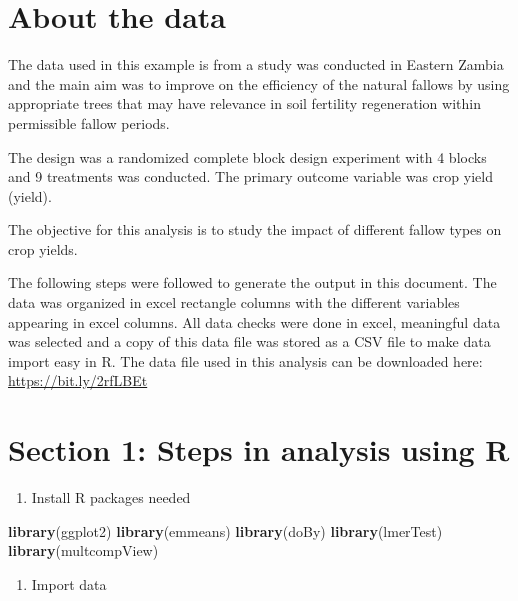 \documentclass[]{book}
\newenvironment{Shaded}{\begin{snugshade}}{\end{snugshade}}
\newcommand{\KeywordTok}[1]{\textcolor[rgb]{0.13,0.29,0.53}{\textbf{#1}}}
\newcommand{\NormalTok}[1]{#1}
\providecommand{\tightlist}{%
  \setlength{\itemsep}{0pt}\setlength{\parskip}{0pt}}
\theoremstyle{definition}
\theoremstyle{definition}
\theoremstyle{definition}
\theoremstyle{remark}
\begin{document}
\section{About the data}\label{about-the-data}

The data used in this example is from a study was conducted in Eastern
Zambia and the main aim was to improve on the efficiency of the natural
fallows by using appropriate trees that may have relevance in soil
fertility regeneration within permissible fallow periods.

The design was a randomized complete block design experiment with 4
blocks and 9 treatments was conducted. The primary outcome variable was
crop yield (yield).

The objective for this analysis is to study the impact of different
fallow types on crop yields.

The following steps were followed to generate the output in this
document. The data was organized in excel rectangle columns with the
different variables appearing in excel columns. All data checks were
done in excel, meaningful data was selected and a copy of this data file
was stored as a CSV file to make data import easy in R. The data file
used in this analysis can be downloaded here:
\url{https://bit.ly/2rfLBEt}

\section{Section 1: Steps in analysis using
R}\label{section-1-steps-in-analysis-using-r}

\begin{enumerate}
\def\labelenumi{\arabic{enumi}.}
\tightlist
\item
  Install R packages needed
\end{enumerate}

\begin{Shaded}
\begin{Highlighting}[]
\KeywordTok{library}\NormalTok{(ggplot2)}
\KeywordTok{library}\NormalTok{(emmeans)}
\KeywordTok{library}\NormalTok{(doBy)}
\KeywordTok{library}\NormalTok{(lmerTest)}
\KeywordTok{library}\NormalTok{(multcompView)}
\end{Highlighting}
\end{Shaded}

\begin{enumerate}
\def\labelenumi{\arabic{enumi}.}
\setcounter{enumi}{1}
\tightlist
\item
  Import data
\end{enumerate}
\end{document}
